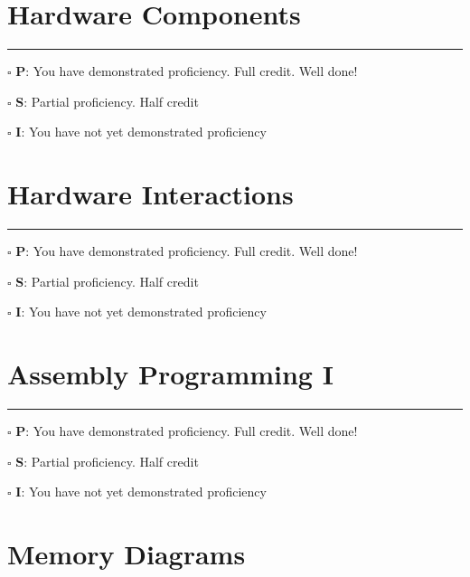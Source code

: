 \documentclass[12pt]{article}
\begin{document}
\newpage


\section*{Hardware Components}

\vfill

\rule[1ex]{\textwidth}{.1pt}

$\square$ \textbf{P}: You have demonstrated proficiency. Full credit. Well done!

$\square$ \textbf{S}: Partial proficiency. Half credit

$\square$ \textbf{I}: You have not yet demonstrated proficiency

\newpage


\section*{Hardware Interactions}

\vfill

\rule[1ex]{\textwidth}{.1pt}

$\square$ \textbf{P}: You have demonstrated proficiency. Full credit. Well done!

$\square$ \textbf{S}: Partial proficiency. Half credit

$\square$ \textbf{I}: You have not yet demonstrated proficiency

\newpage


\section*{Assembly Programming I}

\vfill

\rule[1ex]{\textwidth}{.1pt}

$\square$ \textbf{P}: You have demonstrated proficiency. Full credit. Well done!

$\square$ \textbf{S}: Partial proficiency. Half credit

$\square$ \textbf{I}: You have not yet demonstrated proficiency

\newpage


\section*{Memory Diagrams}
\end{document}

